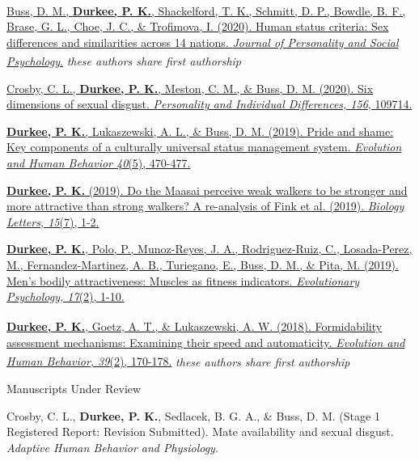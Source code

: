 \documentclass[10.5pt,]{article}
\begin{document}
\hangindent=0.5in
\href{http://www.pdurkee.com/files/pubs/HumanStatusCriteria_2020.pdf}{Buss,
D. M.\textsuperscript{\ddag}, \textbf{Durkee, P.
K.}\textsuperscript{\ddag}, Shackelford, T. K., Schmitt, D. P., Bowdle,
B. F., Brase, G. L., Choe, J. C., \& Trofimova, I. (2020). Human status
criteria: Sex differences and similarities across 14 nations.
\emph{Journal of Personality and Social Psychology}.}
\newline \textsuperscript{\ddag}\emph{these authors share first
authorship}

\hangindent=0.5in
\href{http://www.pdurkee.com/files/pubs/CrosbyDurkeeMeston\&Buss_2020_SDI.pdf}{Crosby,
C. L., \textbf{Durkee, P. K.}, Meston, C. M., \& Buss, D. M. (2020). Six
dimensions of sexual disgust. \emph{Personality and Individual
Differences, 156}, 109714.}

\hangindent=0.5in
\href{http://www.pdurkee.com/files/pubs/DurkeeLukaszewskiBuss_PrideShame_2019.pdf}{\textbf{Durkee,
P. K.}, Lukaszewski, A. L., \& Buss, D. M. (2019). Pride and shame: Key
components of a culturally universal status management system.
\emph{Evolution and Human Behavior 40}(5), 470-477.}

\hangindent=0.5in
\href{http://www.pdurkee.com/files/pubs/Durkee_2019.pdf}{\textbf{Durkee,
P. K.} (2019). Do the Maasai perceive weak walkers to be stronger and
more attractive than strong walkers? A re-analysis of Fink et al.
(2019). \emph{Biology Letters, 15}(7), 1-2.}

\hangindent=0.5in
\href{https://journals.sagepub.com/doi/pdf/10.1177/1474704919852918}{\textbf{Durkee,
P. K.}, Polo, P., Munoz-Reyes, J. A., Rodriguez-Ruiz, C., Losada-Perez,
M., Fernandez-Martinez, A. B., Turiegano, E., Buss, D. M., \& Pita, M.
(2019). Men's bodily attractiveness: Muscles as fitness indicators.
\emph{Evolutionary Psychology, 17}(2), 1-10.}

\hangindent=0.5in
\href{http://www.pdurkee.com/files/pubs/DurkeeGoetzLukaszewski_2018.pdf}{\textbf{Durkee,
P. K.}\textsuperscript{\ddag}, Goetz, A. T.\textsuperscript{\ddag}, \&
Lukaszewski, A. W. (2018). Formidability assessment mechanisms:
Examining their speed and automaticity. \emph{Evolution and Human
Behavior, 39}(2), 170-178.} \newline \textsuperscript{\ddag}\emph{these
authors share first authorship}

\textcolor{light-gray}{Manuscripts Under Review}

\hangindent=0.5in Crosby, C. L., \textbf{Durkee, P. K.}, Sedlacek, B. G.
A., \& Buss, D. M. (Stage 1 Registered Report: Revision Submitted). Mate
availability and sexual disgust. \emph{Adaptive Human Behavior and
Physiology}.
\end{document}
